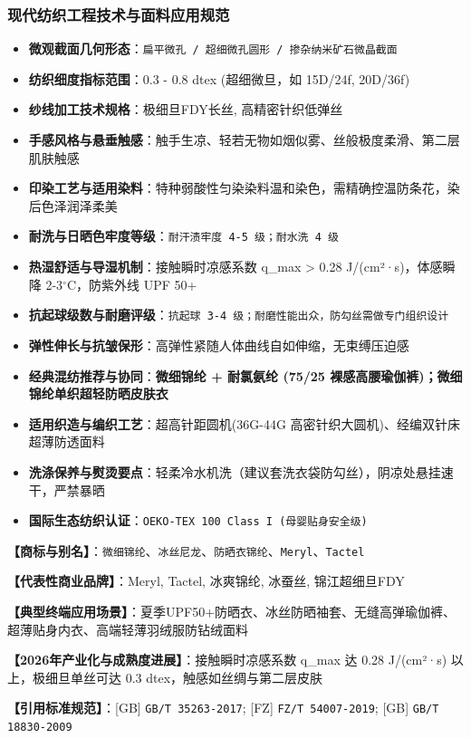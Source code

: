 \documentclass[11pt,openright,twoside,UTF8]{ctexbook}
\begin{document}
\subsubsection*{现代纺织工程技术与面料应用规范}
\begin{itemize} \setlength{\itemsep}{2pt}
    \item \textbf{微观截面几何形态}：\texttt{扁平微孔 / 超细微孔圆形 / 掺杂纳米矿石微晶截面}
    \item \textbf{纺织细度指标范围}：0.3 - 0.8 dtex (超细微旦，如 15D/24f, 20D/36f)
    \item \textbf{纱线加工技术规格}：极细旦FDY长丝, 高精密针织低弹丝
    \item \textbf{手感风格与悬垂触感}：触手生凉、轻若无物如烟似雾、丝般极度柔滑、第二层肌肤触感
    \item \textbf{印染工艺与适用染料}：特种弱酸性匀染染料温和染色，需精确控温防条花，染后色泽润泽柔美
    \item \textbf{耐洗与日晒色牢度等级}：\texttt{耐汗渍牢度 4-5 级；耐水洗 4 级}
    \item \textbf{热湿舒适与导湿机制}：接触瞬时凉感系数 q\_max \textgreater{} 0.28 J/(cm²·s)，体感瞬降 2-3$^\circ\mathrm{C}$，防紫外线 UPF 50+
    \item \textbf{抗起球级数与耐磨评级}：\texttt{抗起球 3-4 级；耐磨性能出众，防勾丝需做专门组织设计}
    \item \textbf{弹性伸长与抗皱保形}：高弹性紧随人体曲线自如伸缩，无束缚压迫感
    \item \textbf{经典混纺推荐与协同}：\textbf{微细锦纶 + 耐氯氨纶 (75/25 裸感高腰瑜伽裤)；微细锦纶单织超轻防晒皮肤衣}
    \item \textbf{适用织造与编织工艺}：超高针距圆机(36G-44G 高密针织大圆机)、经编双针床超薄防透面料
    \item \textbf{洗涤保养与熨烫要点}：轻柔冷水机洗（建议套洗衣袋防勾丝），阴凉处悬挂速干，严禁暴晒
    \item \textbf{国际生态纺织认证}：\texttt{OEKO-TEX 100 Class I (母婴贴身安全级)}
\end{itemize}
\vspace{0.2cm}

\noindent\textbf{【商标与别名】}：\texttt{微细锦纶}、\texttt{冰丝尼龙}、\texttt{防晒衣锦纶}、\texttt{Meryl}、\texttt{Tactel}\par
\noindent\textbf{【代表性商业品牌】}：Meryl, Tactel, 冰爽锦纶, 冰蚕丝, 锦江超细旦FDY\par
\noindent\textbf{【典型终端应用场景】}：夏季UPF50+防晒衣、冰丝防晒袖套、无缝高弹瑜伽裤、超薄贴身内衣、高端轻薄羽绒服防钻绒面料\par
\noindent\textbf{【2026年产业化与成熟度进展】}：接触瞬时凉感系数 q\_max 达 0.28 J/(cm²·s) 以上，极细旦单丝可达 0.3 dtex，触感如丝绸与第二层皮肤\par
\noindent\textbf{【引用标准规范】}：[GB] \texttt{GB/T 35263-2017}; [FZ] \texttt{FZ/T 54007-2019}; [GB] \texttt{GB/T 18830-2009}\par
\vspace{0.5cm}
\end{document}
